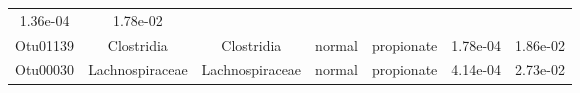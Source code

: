 \documentclass[11pt,]{article}
\begin{document}
\begin{longtable}[]{@{}ccccccc@{}}
\begin{minipage}[t]{0.09\columnwidth}
1.36e-04\strut
\end{minipage} & \begin{minipage}[t]{0.09\columnwidth}\centering\strut
1.78e-02\strut
\end{minipage}\tabularnewline
\begin{minipage}[t]{0.09\columnwidth}\centering\strut
Otu01139\strut
\end{minipage} & \begin{minipage}[t]{0.17\columnwidth}\centering\strut
Clostridia\strut
\end{minipage} & \begin{minipage}[t]{0.17\columnwidth}\centering\strut
Clostridia\strut
\end{minipage} & \begin{minipage}[t]{0.09\columnwidth}\centering\strut
normal\strut
\end{minipage} & \begin{minipage}[t]{0.11\columnwidth}\centering\strut
propionate\strut
\end{minipage} & \begin{minipage}[t]{0.09\columnwidth}\centering\strut
1.78e-04\strut
\end{minipage} & \begin{minipage}[t]{0.09\columnwidth}\centering\strut
1.86e-02\strut
\end{minipage}\tabularnewline
\begin{minipage}[t]{0.09\columnwidth}\centering\strut
Otu00030\strut
\end{minipage} & \begin{minipage}[t]{0.17\columnwidth}\centering\strut
Lachnospiraceae\strut
\end{minipage} & \begin{minipage}[t]{0.17\columnwidth}\centering\strut
Lachnospiraceae\strut
\end{minipage} & \begin{minipage}[t]{0.09\columnwidth}\centering\strut
normal\strut
\end{minipage} & \begin{minipage}[t]{0.11\columnwidth}\centering\strut
propionate\strut
\end{minipage} & \begin{minipage}[t]{0.09\columnwidth}\centering\strut
4.14e-04\strut
\end{minipage} & \begin{minipage}[t]{0.09\columnwidth}\centering\strut
2.73e-02\strut
\end{minipage}\tabularnewline

\end{longtable}
\end{document}
